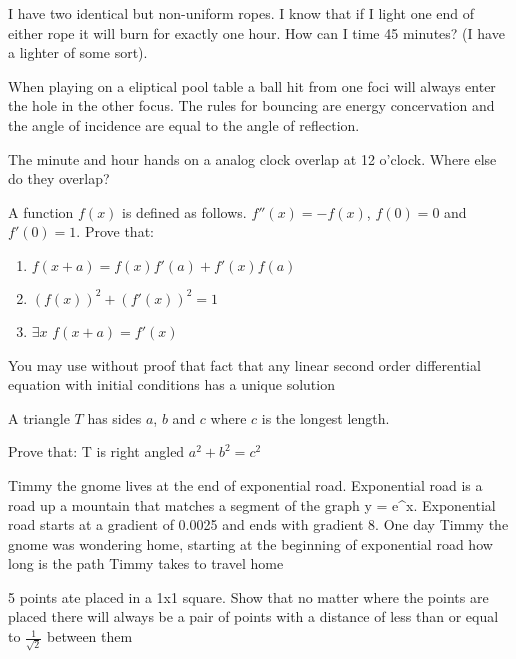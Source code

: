 \item
I have two identical but non-uniform ropes. I know that if I light one end of either rope it will burn for exactly one hour. How can I time 45 minutes? (I have a lighter of some sort).

\item
When playing on a eliptical pool table a ball hit from one foci will always enter the hole in the other focus. The rules for bouncing are energy concervation and the angle of incidence are equal to the angle of reflection.

\item
The minute and hour hands on a analog clock overlap at 12 o’clock. Where else do they overlap?

\item
A function $f(x)$ is defined as follows. $f''(x) = -f(x)$, $f(0) = 0$ and $f'(0) = 1$. Prove that:
\begin{enumerate}
    \item $f(x + a) = f(x)f'(a) + f'(x)f(a)$
    \item $(f(x))^2 + (f'(x))^2 = 1$
    \item $\exists x$ $f(x+a) = f'(x)$
\end{enumerate}
You may use without proof that fact that any linear second order differential equation with initial conditions has a unique solution

\item
A triangle $T$ has sides $a$, $b$ and $c$ where $c$ is the longest length.

Prove that: T is right angled \iff $a^2 + b^2 = c^2$

\item
Timmy the gnome lives at the end of exponential road. Exponential road is a road up a mountain that matches a segment of the graph y = e^x. Exponential road starts at a gradient of 0.0025 and ends with gradient 8. One day Timmy the gnome was wondering home, starting at the beginning of exponential road how long is the path Timmy takes to travel home

\item
5 points ate placed in a 1x1 square. Show that no matter where the points are placed there will always be a pair of points with a distance of less than or equal to $\frac{1}{\sqrt{2}}$ between them

